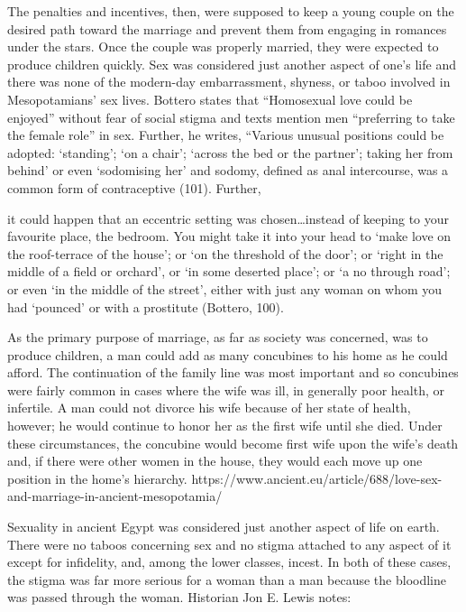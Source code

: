 \documentclass[11pt]{article}
\begin{document}
The penalties and incentives, then, were supposed to keep a young couple on the desired path toward the marriage and prevent them from engaging in romances under the stars. Once the couple was properly married, they were expected to produce children quickly. Sex was considered just another aspect of one’s life and there was none of the modern-day embarrassment, shyness, or taboo involved in Mesopotamians' sex lives. Bottero states that “Homosexual love could be enjoyed” without fear of social stigma and texts mention men “preferring to take the female role” in sex. Further, he writes, “Various unusual positions could be adopted: `standing’; `on a chair’; `across the bed or the partner’; taking her from behind’ or even `sodomising her’ and sodomy, defined as anal intercourse, was a common form of contraceptive (101). Further,

it could happen that an eccentric setting was chosen…instead of keeping to your favourite place, the bedroom. You might take it into your head to `make love on the roof-terrace of the house’; or `on the threshold of the door’; or `right in the middle of a field or orchard’, or `in some deserted place’; or `a no through road’; or even `in the middle of the street’, either with just any woman on whom you had `pounced’ or with a prostitute (Bottero, 100).


As the primary purpose of marriage, as far as society was concerned, was to produce children, a man could add as many concubines to his home as he could afford. The continuation of the family line was most important and so concubines were fairly common in cases where the wife was ill, in generally poor health, or infertile. A man could not divorce his wife because of her state of health, however; he would continue to honor her as the first wife until she died. Under these circumstances, the concubine would become first wife upon the wife’s death and, if there were other women in the house, they would each move up one position in the home’s hierarchy.
https://www.ancient.eu/article/688/love-sex-and-marriage-in-ancient-mesopotamia/



Sexuality in ancient Egypt was considered just another aspect of life on earth. There were no taboos concerning sex and no stigma attached to any aspect of it except for infidelity, and, among the lower classes, incest. In both of these cases, the stigma was far more serious for a woman than a man because the bloodline was passed through the woman. Historian Jon E. Lewis notes:
\end{document}
